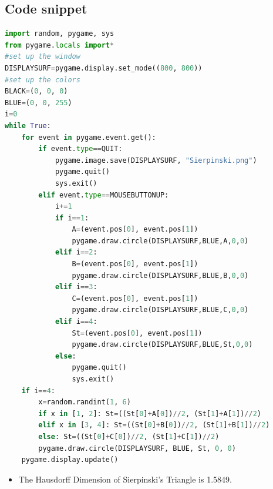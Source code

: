 \documentclass[a0,portrait]{a0poster}
\begin{document}
\begin{multicols}{3}
\subsection*{Code snippet}
\begin{lstlisting}[language=Python, frame=single]
import random, pygame, sys
from pygame.locals import*
#set up the window
DISPLAYSURF=pygame.display.set_mode((800, 800))
#set up the colors
BLACK=(0, 0, 0)
BLUE=(0, 0, 255)
i=0
while True:
    for event in pygame.event.get():
        if event.type==QUIT:
            pygame.image.save(DISPLAYSURF, "Sierpinski.png")
            pygame.quit()
            sys.exit()
        elif event.type==MOUSEBUTTONUP:
            i+=1
            if i==1:
                A=(event.pos[0], event.pos[1])
                pygame.draw.circle(DISPLAYSURF,BLUE,A,0,0)
            elif i==2:
                B=(event.pos[0], event.pos[1])
                pygame.draw.circle(DISPLAYSURF,BLUE,B,0,0)
            elif i==3:
                C=(event.pos[0], event.pos[1])
                pygame.draw.circle(DISPLAYSURF,BLUE,C,0,0)
            elif i==4:
                St=(event.pos[0], event.pos[1])
                pygame.draw.circle(DISPLAYSURF,BLUE,St,0,0)
            else:
                pygame.quit()
                sys.exit()
    if i==4:
        x=random.randint(1, 6)
        if x in [1, 2]: St=((St[0]+A[0])//2, (St[1]+A[1])//2)
        elif x in [3, 4]: St=((St[0]+B[0])//2, (St[1]+B[1])//2)
        else: St=((St[0]+C[0])//2, (St[1]+C[1])//2)
        pygame.draw.circle(DISPLAYSURF, BLUE, St, 0, 0)
    pygame.display.update()
\end{lstlisting}

\begin{itemize}
\item The Hausdorff Dimension of Sierpinski's Triangle is 1.5849.
\end{itemize}


\end{multicols}
\end{document}

